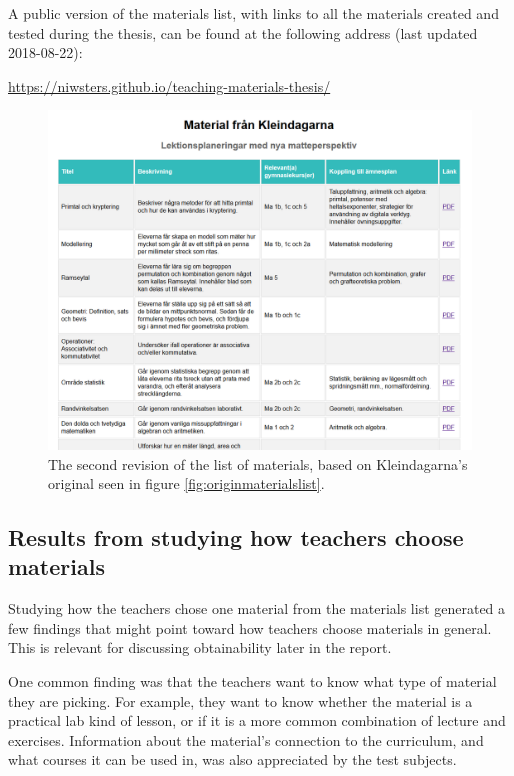 A public version of the materials list, with links to all the materials created and tested during the thesis, can be found at the following address (last updated 2018-08-22):

\url{https://niwsters.github.io/teaching-materials-thesis/}

\vfill
\newpage

\begin{figure}[H]
\centering
\includegraphics[width=\linewidth]{figure/screenshot_materiallista_revision_2.png}
  \caption{The second revision of the list of materials, based on Kleindagarna's original seen in figure \ref{fig:originmaterialslist}.}
  \label{fig:revmaterialslist}
\end{figure}

\subsection{Results from studying how teachers choose materials} \label{pickmaterials}

Studying how the teachers chose one material from the materials list generated a few findings that might point toward how teachers choose materials in general. This is relevant for discussing obtainability later in the report.

One common finding was that the teachers want to know what type of material they are picking. For example, they want to know whether the material is a practical lab kind of lesson, or if it is a more common combination of lecture and exercises. Information about the material's connection to the curriculum, and what courses it can be used in, was also appreciated by the test subjects.

